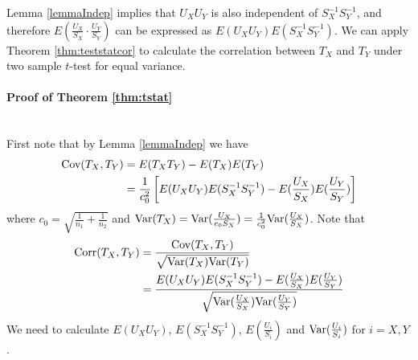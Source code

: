 Lemma \ref{lemmaIndep} implies that  $U_XU_Y$ is also independent of $S_X^{-1}S_Y^{-1}$, and
therefore $E(\frac{U_X}{S_X} \cdot\frac{U_Y}{S_Y})$ can be expressed as
$E(U_XU_Y)E(S_X^{-1}S_Y^{-1})$. We can apply Theorem \ref{thm:teststatcor} to calculate the 
correlation between $T_X$ and $T_Y$ under two sample $t$-test for equal variance. 

\paragraph*{Proof of Theorem \ref{thm:tstat}} \\
First note that by Lemma  \ref{lemmaIndep} we have
\begin{align*}
\text{Cov}(T_X, T_Y) &= E(T_XT_Y) - E(T_X)E(T_Y) \\
& = \frac{1}{c_0^2} \left[E(U_XU_Y)E(S_X^{-1}S_Y^{-1}) - E(\frac{U_X}{S_X})E( 
\frac{U_Y}{S_Y})\right]   
\end{align*}
where $c_0 = \sqrt{\frac{1}{n_1} + \frac{1}{n_2}}$ and $\text{Var}(T_X) = \text{Var}(\frac{U_X}{c_0S_X})=
\frac{1}{c_0^2}\text{Var}(\frac{U_X}{S_X})$. 
Note that 
\begin{equation}\label{eq:Tcorrelation}
\begin{aligned}
\text{Corr}(T_X, T_Y) & = \frac{\text{Cov}(T_X, T_Y) }{\sqrt{\text{Var}(T_X) \text{Var}(T_Y) }} \\
& = \frac{E(U_XU_Y)E(S_X^{-1}S_Y^{-1}) - E(\frac{U_X}{S_X})E(
	\frac{U_Y}{S_Y})}{\sqrt{\text{Var}(\frac{U_X}{S_X})\text{Var}(\frac{U_Y}{S_Y})}} 
\end{aligned}
\end{equation}
We need to calculate $E(U_XU_Y)$, $E(S_X^{-1}S_Y^{-1})$, $ E(\frac{U_i}{S_i})$ and
$\text{Var}(\frac{U_i}{S_i})$ for $i =X, Y$. 
